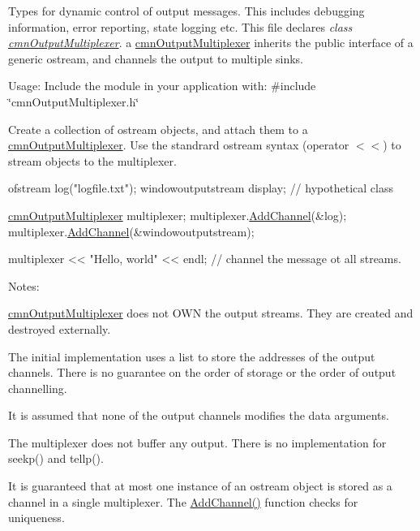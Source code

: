 Types for dynamic control of output messages. This includes debugging information, error reporting, state logging etc. This file declares {\itshape class \hyperlink{classcmn_output_multiplexer}{cmn\-Output\-Multiplexer}}. a \hyperlink{classcmn_output_multiplexer}{cmn\-Output\-Multiplexer} inherits the public interface of a generic ostream, and channels the output to multiple sinks.

Usage\-: Include the module in your application with\-: \#include \char`\"{}cmn\-Output\-Multiplexer.\-h\char`\"{}

Create a collection of ostream objects, and attach them to a \hyperlink{classcmn_output_multiplexer}{cmn\-Output\-Multiplexer}. Use the standrard ostream syntax (operator $<$$<$) to stream objects to the multiplexer.


\begin{DoxyCode}
ofstream log(\textcolor{stringliteral}{"logfile.txt"});
windowoutputstream display;  \textcolor{comment}{// hypothetical class}

\hyperlink{classcmn_output_multiplexer}{cmnOutputMultiplexer} multiplexer;
multiplexer.\hyperlink{classcmn_output_multiplexer_a70d534895f21217e1e7e75e837fc65e7}{AddChannel}(&log);
multiplexer.\hyperlink{classcmn_output_multiplexer_a70d534895f21217e1e7e75e837fc65e7}{AddChannel}(&windowoutputstream);

multiplexer << \textcolor{stringliteral}{"Hello, world"} << endl;  \textcolor{comment}{// channel the message ot all streams.}
\end{DoxyCode}


Notes\-:
\begin{DoxyEnumerate}
\item \hyperlink{classcmn_output_multiplexer}{cmn\-Output\-Multiplexer} does not O\-W\-N the output streams. They are created and destroyed externally.
\item The initial implementation uses a list to store the addresses of the output channels. There is no guarantee on the order of storage or the order of output channelling.
\item It is assumed that none of the output channels modifies the data arguments.
\item The multiplexer does not buffer any output. There is no implementation for seekp() and tellp().
\item It is guaranteed that at most one instance of an ostream object is stored as a channel in a single multiplexer. The \hyperlink{classcmn_output_multiplexer_a70d534895f21217e1e7e75e837fc65e7}{Add\-Channel()} function checks for uniqueness. 
\end{DoxyEnumerate}

